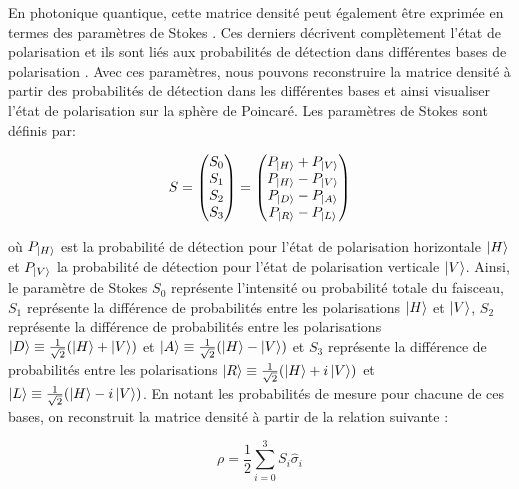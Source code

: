 \begin{onehalfspace}
    \noindent En photonique quantique, cette matrice densité peut 
    également être exprimée en termes des paramètres de Stokes 
    \cite{Kwiat}. Ces derniers décrivent complètement l’état de 
    polarisation et ils sont liés aux probabilités de détection dans 
    différentes bases de polarisation \cite{hecht2012optics}. Avec ces
    paramètres, nous pouvons reconstruire la matrice densité
    à partir des probabilités de détection dans les différentes bases et
    ainsi visualiser l'état de polarisation sur la sphère de Poincaré.
    Les paramètres de Stokes sont définis par:

    \begin{equation}
        S = \begin{pmatrix}
            S_0\\
            S_1\\
            S_2\\
            S_3
        \end{pmatrix}
        = \begin{pmatrix}
            P_{\ket{H}} + P_{\ket{V}}\\
            P_{\ket{H}} - P_{\ket{V}}\\
            P_{\ket{D}} - P_{\ket{A}}\\
            P_{\ket{R}} - P_{\ket{L}}
        \end{pmatrix}
    \end{equation}

    \noindent où $P_{\ket{H}}$ est la probabilité de détection pour l'état de
    polarisation horizontale $\ket{H}$ et $P_{\ket{V}}$ la probabilité de
    détection pour l'état de polarisation verticale $\ket{V}$. Ainsi, le
    paramètre de Stokes $S_0$ représente l’intensité ou probabilité
    totale du faisceau, $S_1$ représente la différence de probabilités
    entre les polarisations $\ket{H}$ et $\ket{V}$, $S_2$ représente la
    différence de probabilités entre les polarisations 
    $\ket{D} \equiv \frac{1}{\sqrt{2}}(\ket{H} + \ket{V})$ et $\ket{A} \equiv \frac{1}{\sqrt{2}}(\ket{H} - \ket{V})$ 
    et $S_3$ représente la différence de probabilités entre les polarisations 
    $\ket{R} \equiv \frac{1}{\sqrt{2}}(\ket{H}+i\ket{V})$ et $\ket{L} \equiv \frac{1}{\sqrt{2}}(\ket{H} - i\ket{V})$. 
    En notant les probabilités de mesure pour chacune de ces bases, on 
    reconstruit la matrice densité à partir de la relation suivante \cite{Kwiat}:
    
    \begin{equation}
        \rho = \frac{1}{2}\sum_{i=0}^{3} S_i \hat{\sigma}_i \label{eq:density_stokes}
    \end{equation}


\end{onehalfspace}
